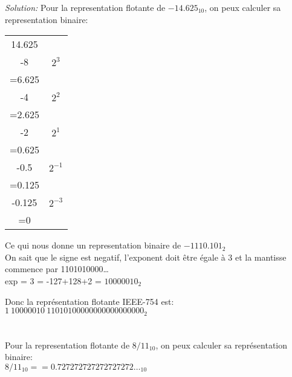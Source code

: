 \documentclass{article}
\newenvironment{solution}
    {\textit{Solution:}}
    {}
\begin{document}
\begin{solution}
    Pour la representation flotante de $-14.625_{10}$, on peux calculer sa representation binaire:\\
    \begin{tabular}{|c|c|}
        \hline
        14.625 \\
        -8 & $2^3$\\
        \hline
        =6.625 \\
        -4 & $2^2$\\ 
        \hline
        =2.625 \\ 
        -2 & $2^1$\\
        \hline
        =0.625\\ 
        -0.5 & $2^{-1}$\\ 
        \hline
        =0.125\\ 
        -0.125 & $2^{-3}$\\ 
        \hline
        =0\\ 
        \hline
    \end{tabular}
    Ce qui nous donne un representation binaire de $-1110.101_2$\\

    On sait que le signe est negatif, l'exponent doit être égale à 3 et la mantisse commence par 1101010000\dots\\

    exp = 3 = -127+128+2 = $10000010_2$

    Donc la représentation flotante IEEE-754 est: \\
    $1\ 10000010\ 11010100000000000000000_2$ \\\\\\

    Pour la representation flotante de $8/11_{10}$, on peux calculer sa représentation binaire:\\
    $8/11_{10} == 0.727272727272727272\dots_{10}$


\end{solution}
\end{document}
